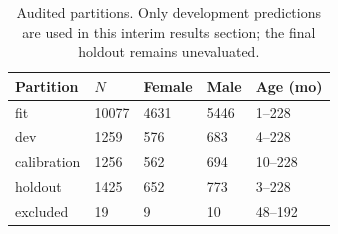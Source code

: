\begin{table}[!t]
\centering\footnotesize
\caption{Audited partitions. Only development predictions are used in this interim results section; the final holdout remains unevaluated.}
\label{tab:prelim_partitions}
\begin{tabularx}{\columnwidth}{@{}p{27mm}XXXX@{}}
\toprule
Partition & $N$ & Female & Male & Age (mo) \\
\midrule
fit & 10077 & 4631 & 5446 & 1--228 \\
dev & 1259 & 576 & 683 & 4--228 \\
calibration & 1256 & 562 & 694 & 10--228 \\
holdout & 1425 & 652 & 773 & 3--228 \\
excluded & 19 & 9 & 10 & 48--192 \\
\bottomrule
\end{tabularx}
\end{table}
